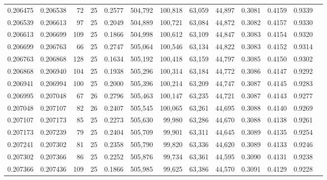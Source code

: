 \begin{tabular}{rrrrrrrrrrrrr}
0.206475 & 0.206538 &    72 &  25 &                                     0.2577 & 504,792 & 100,818 &  63,059 &  44,897 & 0.3081 & 0.4159 & 0.9339 \\
0.206539 & 0.206613 &    97 &  25 &                                     0.2049 & 504,889 & 100,721 &  63,084 &  44,872 & 0.3082 & 0.4157 & 0.9330 \\
0.206613 & 0.206699 &   109 &  25 &                                     0.1866 & 504,998 & 100,612 &  63,109 &  44,847 & 0.3083 & 0.4154 & 0.9320 \\
0.206699 & 0.206763 &    66 &  25 &                                     0.2747 & 505,064 & 100,546 &  63,134 &  44,822 & 0.3083 & 0.4152 & 0.9314 \\
0.206763 & 0.206868 &   128 &  25 &                                     0.1634 & 505,192 & 100,418 &  63,159 &  44,797 & 0.3085 & 0.4150 & 0.9302 \\
0.206868 & 0.206940 &   104 &  25 &                                     0.1938 & 505,296 & 100,314 &  63,184 &  44,772 & 0.3086 & 0.4147 & 0.9292 \\
0.206941 & 0.206994 &   100 &  25 &                                     0.2000 & 505,396 & 100,214 &  63,209 &  44,747 & 0.3087 & 0.4145 & 0.9283 \\
0.206995 & 0.207048 &    67 &  26 &                                     0.2796 & 505,463 & 100,147 &  63,235 &  44,721 & 0.3087 & 0.4143 & 0.9277 \\
0.207048 & 0.207107 &    82 &  26 &                                     0.2407 & 505,545 & 100,065 &  63,261 &  44,695 & 0.3088 & 0.4140 & 0.9269 \\
0.207107 & 0.207173 &    85 &  25 &                                     0.2273 & 505,630 &  99,980 &  63,286 &  44,670 & 0.3088 & 0.4138 & 0.9261 \\
0.207173 & 0.207239 &    79 &  25 &                                     0.2404 & 505,709 &  99,901 &  63,311 &  44,645 & 0.3089 & 0.4135 & 0.9254 \\
0.207241 & 0.207302 &    81 &  25 &                                     0.2358 & 505,790 &  99,820 &  63,336 &  44,620 & 0.3089 & 0.4133 & 0.9246 \\
0.207302 & 0.207366 &    86 &  25 &                                     0.2252 & 505,876 &  99,734 &  63,361 &  44,595 & 0.3090 & 0.4131 & 0.9238 \\
0.207366 & 0.207436 &   109 &  25 &                                     0.1866 & 505,985 &  99,625 &  63,386 &  44,570 & 0.3091 & 0.4129 & 0.9228 \\

\end{tabular}
